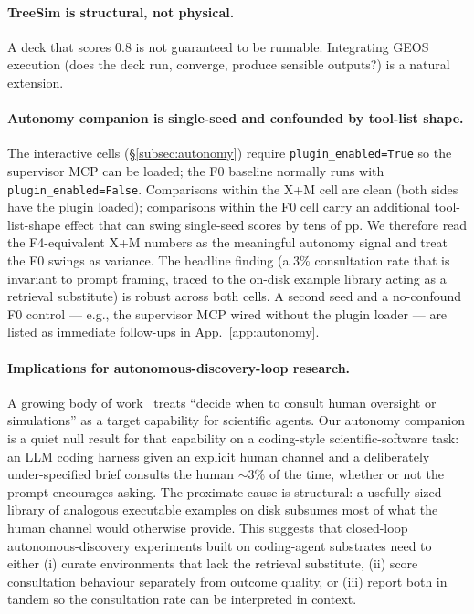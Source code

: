 \documentclass{article}
\begin{document}
\paragraph{TreeSim is structural, not physical.}
A deck that scores 0.8 is not guaranteed to be runnable. Integrating GEOS execution (does the deck run, converge, produce sensible outputs?) is a natural extension.

\paragraph{Autonomy companion is single-seed and confounded by tool-list shape.}
The interactive cells (\S\ref{subsec:autonomy}) require \texttt{plugin\_enabled=True} so the supervisor MCP can be loaded; the F0 baseline normally runs with \texttt{plugin\_enabled=False}. Comparisons within the X+M cell are clean (both sides have the plugin loaded); comparisons within the F0 cell carry an additional tool-list-shape effect that can swing single-seed scores by tens of pp. We therefore read the F4-equivalent X+M numbers as the meaningful autonomy signal and treat the F0 swings as variance. The headline finding (a 3\% consultation rate that is invariant to prompt framing, traced to the on-disk example library acting as a retrieval substitute) is robust across both cells. A second seed and a no-confound F0 control --- e.g., the supervisor MCP wired without the plugin loader --- are listed as immediate follow-ups in App.~\ref{app:autonomy}.

\paragraph{Implications for autonomous-discovery-loop research.}
A growing body of work~\citep{boiko2023coscientist,bran2024chemcrow,lu2024aiscientist,alber2025cellvoyager} treats ``decide when to consult human oversight or simulations'' as a target capability for scientific agents. Our autonomy companion is a quiet null result for that capability on a coding-style scientific-software task: an LLM coding harness given an explicit human channel and a deliberately under-specified brief consults the human ${\sim}3\%$ of the time, whether or not the prompt encourages asking. The proximate cause is structural: a usefully sized library of analogous executable examples on disk subsumes most of what the human channel would otherwise provide. This suggests that closed-loop autonomous-discovery experiments built on coding-agent substrates need to either (i) curate environments that lack the retrieval substitute, (ii) score consultation behaviour separately from outcome quality, or (iii) report both in tandem so the consultation rate can be interpreted in context.
\end{document}
